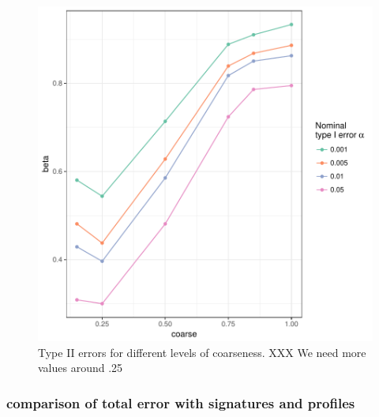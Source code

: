 \documentclass[12pt]{article}
\begin{document}
\begin{figure}

{\centering \includegraphics[width=\textwidth]{figures/unnamed-chunk-6-1} 

}

\caption{Type II errors for different levels of coarseness. XXX We need more values around .25}\label{fig:unnamed-chunk-6}
\end{figure}

\subsubsection{comparison of total error with signatures and
profiles}\label{comparison-of-total-error-with-signatures-and-profiles}
\end{document}
